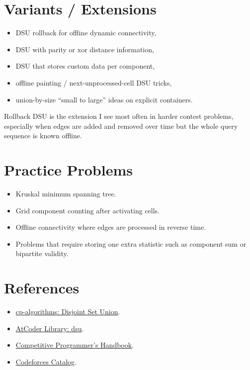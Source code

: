 \section*{Variants / Extensions}

\begin{itemize}
  \item DSU rollback for offline dynamic connectivity,
  \item DSU with parity or xor distance information,
  \item DSU that stores custom data per component,
  \item offline painting / next-unprocessed-cell DSU tricks,
  \item union-by-size ``small to large'' ideas on explicit containers.
\end{itemize}

Rollback DSU is the extension I see most often in harder contest problems, especially when edges are added and removed
over time but the whole query sequence is known offline.

\section*{Practice Problems}

\begin{itemize}
  \item Kruskal minimum spanning tree.
  \item Grid component counting after activating cells.
  \item Offline connectivity where edges are processed in reverse time.
  \item Problems that require storing one extra statistic such as component sum or bipartite validity.
\end{itemize}

\section*{References}

\begin{itemize}
  \item \href{https://cp-algorithms.com/data_structures/disjoint_set_union.html}{cp-algorithms: Disjoint Set Union}.
  \item \href{https://atcoder.github.io/ac-library/production/document_en/dsu.html}{AtCoder Library: dsu}.
  \item \href{https://usaco.guide/CPH.pdf}{Competitive Programmer's Handbook}.
  \item \href{https://codeforces.com/catalog}{Codeforces Catalog}.
\end{itemize}

